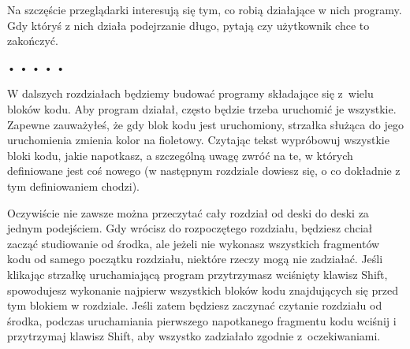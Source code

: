   
Na szczęście przeglądarki interesują się tym, co robią działające w nich programy. Gdy któryś z nich działa podejrzanie długo, pytają czy użytkownik chce to zakończyć.


\begin{center}
• • • • •
\end{center}

  
W dalszych rozdziałach będziemy budować programy składające się z~wielu bloków kodu. Aby program działał, często będzie trzeba uruchomić je wszystkie. Zapewne zauważyłeś, że gdy blok kodu jest uruchomiony, strzałka służąca do jego uruchomienia zmienia kolor na fioletowy. Czytając tekst wypróbowuj wszystkie bloki kodu, jakie napotkasz, a szczególną uwagę zwróć na te, w których definiowane jest coś nowego (w następnym rozdziale dowiesz się, o co dokładnie z tym definiowaniem chodzi).

  
Oczywiście nie zawsze można przeczytać cały rozdział od deski do deski za jednym podejściem. Gdy wrócisz do rozpoczętego rozdziału, będziesz chciał zacząć studiowanie od środka, ale jeżeli nie wykonasz wszystkich fragmentów kodu od samego początku rozdziału, niektóre rzeczy mogą nie zadziałać. Jeśli klikając strzałkę uruchamiającą program przytrzymasz wciśnięty klawisz Shift, spowodujesz wykonanie najpierw wszystkich bloków kodu znajdujących się przed tym blokiem w rozdziale. Jeśli zatem będziesz zaczynać czytanie rozdziału od środka, podczas uruchamiania pierwszego napotkanego fragmentu kodu wciśnij i przytrzymaj klawisz Shift, aby wszystko zadziałało zgodnie z~oczekiwaniami.